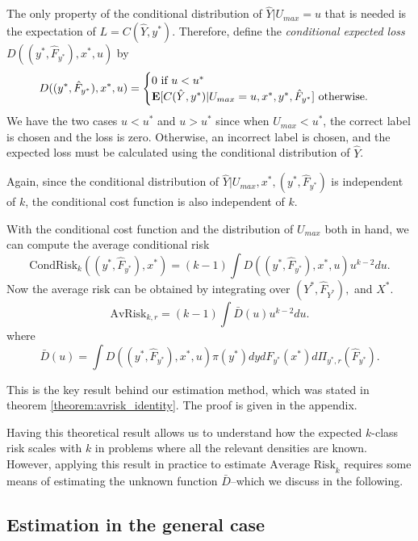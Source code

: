\documentclass[12pt]{article}
\begin{document}
The only property of the conditional distribution of $\hat{Y}|U_{max} = u$ that is needed is
the expectation of $L = C(\hat{Y}, y^*)$.  Therefore, define the \emph{conditional expected loss} $D((y^*, \hat{F}_{y^*}), x^*, u)$ by
\begin{equation}\label{eq:Kfunc}
D((y^*, \hat{F}_{y^*}), x^*, u) = \begin{cases} 0 \text{ if } u < u^*\\
\textbf{E}[C(\hat{Y}, y^*)|U_{max} = u, x^*, y^*, \hat{F}_{y^*}] \text{ otherwise.}
\end{cases}
\end{equation}
We have the two cases $u < u^*$ and $u > u^*$ since when $U_{max} <
u^*$, the correct label is chosen and the loss is zero.  Otherwise, an
incorrect label is chosen, and the expected loss must be calculated
using the conditional distribution of $\hat{Y}$.

Again, since the conditional distribution of $\hat{Y}|U_{max}, x^*,
(y^*, \hat{F}_{y^*})$ is independent of $k$, the conditional cost
function is also independent of $k$.

With the conditional cost function and the distribution of $U_{max}$ both in hand, we can compute the average conditional risk
\[
\text{CondRisk}_k((y^*, \hat{F}_{y^*}), x^*) = (k-1) \int D((y^*,\hat{F}_{y^*}), x^*, u) u^{k-2} du.
\]
Now the average risk can be obtained by integrating over $(Y^*, \hat{F}_{Y^*}),$ and $X^*$.
\[
\text{AvRisk}_{k, r} = (k-1) \int \bar{D}(u) u^{k-2} du.
\]
where
\begin{equation}\label{eq:Kbar}
\bar{D}(u) = \int D((y^*,\hat{F}_{y^*}), x^*, u) \pi(y^*)dy dF_{y^*}(x^*) d\Pi_{y^*, r}(\hat{F}_{y^*}).
\end{equation}


This is the key result behind our estimation method, which was stated in theorem \ref{theorem:avrisk_identity}. 
The proof is given in the appendix.

Having this theoretical result allows us to understand how the
expected $k$-class risk scales with $k$ in problems where all the
relevant densities are known.  However, applying this result in
practice to estimate $\text{Average Risk}_k$ requires some means of
estimating the unknown function $\bar{D}$--which we discuss in the
following.

\subsection{Estimation in the general case}\label{sec:estimation}
\end{document}
